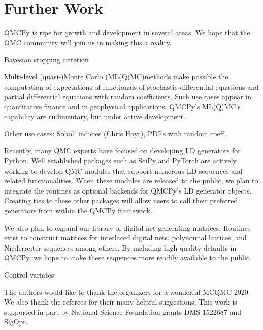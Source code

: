 \documentclass[graybox,footinfo]{svmult}
\begin{document}
\section{Further Work} \label{sec:further}

QMCPy is ripe for growth and development in several areas.  We hope that the QMC community will join us in making this a reality.

Bayesian stopping criterion

Multi-level (quasi-)Monte Carlo (ML(Q)MC)methods make possible the computation of expectations of functionals of stochastic differential equations and partial differential equations with random coefficients.  Such use cases appear in quantitative finance and in geophysical applications.  QMCPy's ML(Q)MC's capability are rudimentary, but under active development.

Other use cases:  Sobol' indicies (Chris Hoyt), PDEs with random coeff.

Recently, many QMC experts have focused on developing LD generators for Python. Well established packages such as SciPy \cite{SCIPY} and PyTorch \cite{PyTorch} are actively working to develop QMC modules that support numerous LD sequences and related functionalities. When these modules are released to the public, we plan to integrate the routines as optional backends for QMCPy's LD generator objects. Creating ties to these other packages will allow users to call their preferred generators from within the QMCPy framework. 

We also plan to expand our library of digital net generating matrices. Routines exist to construct matrices for interlaced digital nets, polynomial lattices, and Niederreiter sequences among others. By including high quality defaults in QMCPy, we hope to make these sequences more readily available to the public. 

Control variates 

\begin{acknowledgement}
The authors would like to thank the organizers for a wonderful MCQMC 2020. 
We also thank the referees for their many helpful suggestions.  This work is supported in part by National Science Foundation grants DMS-1522687 and SigOpt.
\end{acknowledgement}



\end{document}
